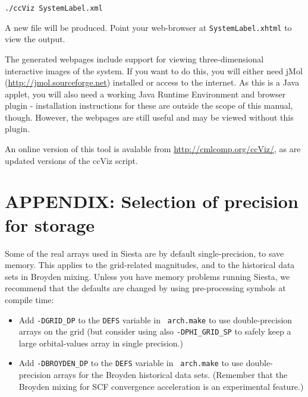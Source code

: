 \documentclass[11pt]{article}
\begin{document}
\texttt{./ccViz SystemLabel.xml}

A new file will be produced. Point your web-browser at \texttt{SystemLabel.xhtml}
to view the output.

The generated webpages include support for viewing three-dimensional
interactive images of the system. If you want to do this, you will
either need jMol (\url{http://jmol.sourceforge.net}) installed or access
to the internet. As this
is a Java applet, you will also need a working Java Runtime
Environment and browser plugin - installation instructions for these
are outside the scope of this manual, though. However, the webpages
are still useful and may be viewed without this plugin.

An online version of this tool is avalable from
\url{http://cmlcomp.org/ccViz/}, as are updated versions of
the ccViz script.

\newpage
\section{APPENDIX: Selection of precision for storage}

Some of the real arrays used in Siesta are by default
single-precision, to save memory. This applies to the grid-related
magnitudes, and to the historical data sets in Broyden mixing. 
Unless you have memory problems running Siesta, we recommend that 
the defaults are changed by using pre-processing symbols at compile
time:

\begin{itemize}
\item Add {\tt -DGRID\_DP} to the {\tt DEFS} variable in {\tt
  arch.make} to use double-precision arrays on the grid (but
  consider using also {\tt -DPHI\_GRID\_SP} to safely keep a large orbital-values
  array in single precision.)

\item Add {\tt -DBROYDEN\_DP} to the {\tt DEFS} variable in {\tt
  arch.make} to use double-precision arrays for the Broyden historical
  data sets. (Remember that the Broyden mixing for SCF convergence
  acceleration is an experimental feature.)
\end{itemize}

\printindex
\end{document}
